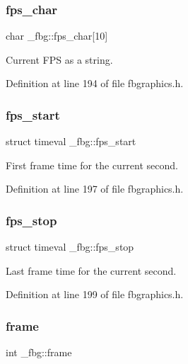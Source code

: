\subsubsection{\texorpdfstring{fps\+\_\+char}{fps\_char}}
{\footnotesize\ttfamily char \+\_\+fbg\+::fps\+\_\+char\mbox{[}10\mbox{]}}



Current F\+PS as a string. 



Definition at line 194 of file fbgraphics.\+h.

\mbox{\label{struct__fbg_a07d7bb827a7595c956fe22c2d65bba33}} 
\subsubsection{\texorpdfstring{fps\+\_\+start}{fps\_start}}
{\footnotesize\ttfamily struct timeval \+\_\+fbg\+::fps\+\_\+start}



First frame time for the current second. 



Definition at line 197 of file fbgraphics.\+h.

\mbox{\label{struct__fbg_ade17a45bbc82bef326857c2837cdf66c}} 
\subsubsection{\texorpdfstring{fps\+\_\+stop}{fps\_stop}}
{\footnotesize\ttfamily struct timeval \+\_\+fbg\+::fps\+\_\+stop}



Last frame time for the current second. 



Definition at line 199 of file fbgraphics.\+h.

\mbox{\label{struct__fbg_aa3ef83f919d12e680f8c64006b441454}} 
\subsubsection{\texorpdfstring{frame}{frame}}
{\footnotesize\ttfamily int \+\_\+fbg\+::frame}



